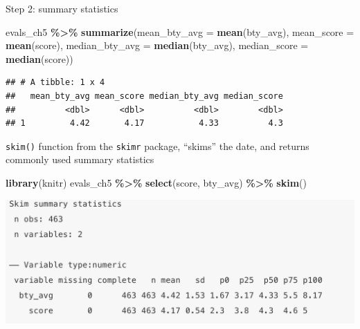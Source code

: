 \documentclass[
  ignorenonframetext,
]{beamer}
\newenvironment{Shaded}{\begin{snugshade}}{\end{snugshade}}
\newcommand{\AttributeTok}[1]{\textcolor[rgb]{0.13,0.29,0.53}{#1}}
\newcommand{\FunctionTok}[1]{\textcolor[rgb]{0.13,0.29,0.53}{\textbf{#1}}}
\newcommand{\NormalTok}[1]{#1}
\newcommand{\SpecialCharTok}[1]{\textcolor[rgb]{0.81,0.36,0.00}{\textbf{#1}}}
\begin{document}
\begin{frame}[fragile]{Step 2: summary statistics}
\protect\hypertarget{step-2-summary-statistics}{}
\tiny

\begin{Shaded}
\begin{Highlighting}[]
\NormalTok{evals\_ch5 }\SpecialCharTok{\%\textgreater{}\%}
  \FunctionTok{summarize}\NormalTok{(}\AttributeTok{mean\_bty\_avg =} \FunctionTok{mean}\NormalTok{(bty\_avg), }\AttributeTok{mean\_score =} \FunctionTok{mean}\NormalTok{(score),}
            \AttributeTok{median\_bty\_avg =} \FunctionTok{median}\NormalTok{(bty\_avg), }\AttributeTok{median\_score =} \FunctionTok{median}\NormalTok{(score))}
\end{Highlighting}
\end{Shaded}

\begin{verbatim}
## # A tibble: 1 x 4
##   mean_bty_avg mean_score median_bty_avg median_score
##          <dbl>      <dbl>          <dbl>        <dbl>
## 1         4.42       4.17           4.33          4.3
\end{verbatim}

\normalsize

\texttt{skim()} function from the \texttt{skimr} package, ``skims'' the
date, and returns commonly used summary statistics

\tiny

\begin{Shaded}
\begin{Highlighting}[]
\FunctionTok{library}\NormalTok{(knitr)}
\NormalTok{evals\_ch5 }\SpecialCharTok{\%\textgreater{}\%} \FunctionTok{select}\NormalTok{(score, bty\_avg) }\SpecialCharTok{\%\textgreater{}\%} \FunctionTok{skim}\NormalTok{()}
\end{Highlighting}
\end{Shaded}

\normalsize

\begin{center}\includegraphics[width=0.7\linewidth,height=0.3\textheight]{week4_1} \end{center}
\end{frame}
\end{document}

